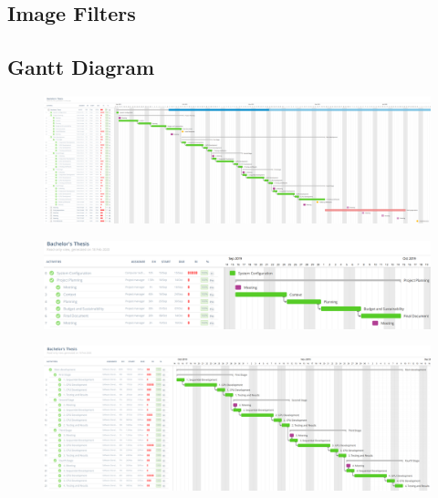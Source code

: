 \documentclass[titlepage,12pt]{report}
\begin{document}
\section{Image Filters}



\newpage

\printbibliography

\begin{appendices}
\chapter{Gantt Diagram}

\uselandscape

\begin{figure}[H]
	\centering
	\includegraphics[scale=0.30]{media/final_gantt_esp.png}
	\label{gantt_esp}
\end{figure}

\begin{figure}[H]
	\centering
  	\includegraphics[scale=0.25]{media/gantt_gep.png}
  	\label{gantt_1}
\end{figure}

\begin{figure}[H]
	\centering
  	\includegraphics[scale=0.25]{media/gantt_dev_esp.png}
  	\label{gantt_2}
\end{figure}


\end{appendices}
\end{document}
